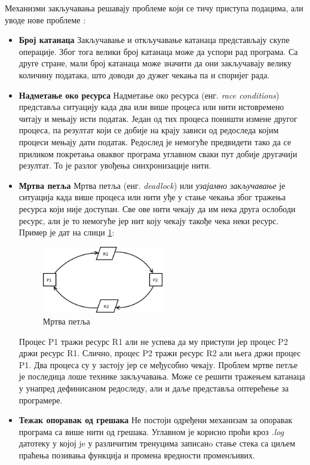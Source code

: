 \documentclass[12pt,oneside]{memoir}
\begin{document}
Механизми закључавања решавају проблеме који се тичу приступа подацима, али уводе нове проблеме \cite{progInScala3, microsoftRaceC}:
\begin{itemize}
\item \textbf{Број катанаца} Закључавање и откључавање катанаца представљају скупе операције. Због тога велики број катанаца може да успори рад програма. Са друге стране, мали број катанаца може значити да они закључавају велику количину података, што доводи до дужег чекања па и споријег рада. 
\item \textbf{Надметање око ресурса} Надметање око ресурса (енг. \textit{race conditions}) представља ситуацију када два или више процеса или нити истовремено читају и мењају исти податак. Један од тих процеса поништи измене другог процеса, па резултат који се добије на крају зависи од редоследа којим процеси мењају дати податак. Редослед је немогуће предвидети тако да се приликом покретања оваквог програма углавном сваки пут добије другачији резултат. То је разлог увођења синхронизације нити.
\item \textbf{Мртва петља} Мртва петља (енг. \textit{deadlock}) или \textit{узајамно закључавање} је ситуација када више процеса или нити уђе у стање чекања због тражења ресурса који није доступан. Све ове нити чекају да им нека друга ослободи ресурс, али је то немогуће јер нит коју чекају такође чека неки ресурс. Пример је дат на слици \ref{fig:deadlock}:
\begin{figure}[!ht]
  \centering
  \includegraphics[width=0.5\textwidth]{deadlock.png}
  \caption{Мртва петља}
  \label{fig:deadlock}
\end{figure}
Процес P1 тражи ресурс R1 али не успева да му приступи јер процес P2 држи ресурс R1. Слично, процес P2 тражи ресурс R2 али њега држи процес P1. Два процеса су у застоју јер се међусобно чекају. Проблем мртве петље је последица лоше технике закључавања. Може се решити тражењем катанаца у унапред дефинисаном редоследу, али и даље представља оптерећење за програмере.

\label{raceCon}
\item \textbf{Тежак опоравак од грешака} Не постоји одређени механизам за опоравак програма са више нити од грешака. Углавном је корисно проћи кроз \textit{.log} датотеку у којој je у различитим тренуцима записанo стање стека са циљем праћења позивања функција и промена вредности променљивих.
\end{itemize}
\end{document}
